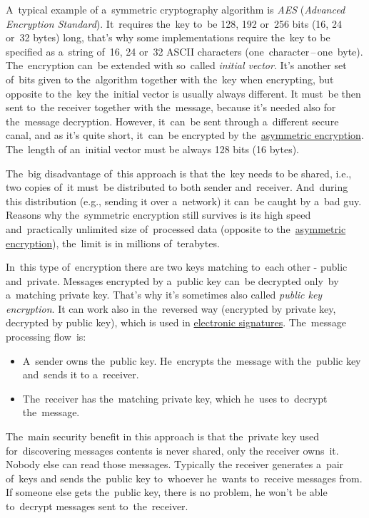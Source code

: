A~typical example of a~symmetric cryptography algorithm is \textit{AES} (\textit{Advanced Encryption Standard}). It~requires the~key to~be 128, 192 or~256 bits (16, 24 or~32 bytes) long, that's why some implementations require the~key to be specified as a~string of~16, 24 or~32 ASCII characters (one~character\,--\,one~byte). The~encryption can~be extended with so~called \textit{initial vector}. It's another set of~bits given to the~algorithm together with the~key when encrypting, but opposite to the~key the~initial vector is usually always different. It must~be then sent to~the receiver together with the~message, because it's needed also for the~message decryption. However, it~can~be sent through a~different secure canal, and as it's quite short, it~can~be encrypted by the~\hyperref[asymmetricencryption]{asymmetric encryption}. The~length of an~initial vector must be always 128 bits (16 bytes).

The~big disadvantage of~this approach is that the~key needs to be shared, i.e., two copies of~it must~be distributed to both sender and~receiver. And~during this distribution (e.g., sending it over a~network) it can~be caught by a~bad guy. Reasons why the~symmetric encryption still survives is its high speed and~practically unlimited size of~processed data (opposite to the~\hyperref[asymmetricencryption]{asymmetric encryption}), the~limit is in millions of~\mbox{terabytes}.

\label{asymmetricencryption}
In~this type of~encryption there are two keys matching to~each other - public and~private. Messages encrypted by a~public key can~be decrypted only~by a~matching private key. That's why it's sometimes also called \textit{public key encryption}. It can work also in the~reversed way (encrypted by private key, decrypted by public key), which is used in \hyperref[electronicsignature]{electronic signatures}. The~message processing flow~is:
\begin{itemize}
    \item A~sender owns the~public key. He~encrypts the~message with the~public key and~sends it to a~receiver.
    \item The~receiver has the~matching private key, which he~uses to~decrypt the~message.
\end{itemize}

\noindent The~main security benefit in this approach is that the~private key used for~discovering messages contents is never shared, only the receiver owns~it. Nobody else can read those messages. Typically the receiver generates a~pair of~keys and sends the~public key to~whoever he~wants to~receive messages from. If someone else gets the~public key, there is no problem, he won't be able to~decrypt messages sent to~the~receiver.

